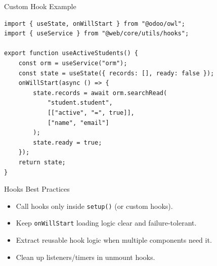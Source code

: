 \begin{frame}[fragile]{Custom Hook Example}
\begin{lstlisting}[style=js]
import { useState, onWillStart } from "@odoo/owl";
import { useService } from "@web/core/utils/hooks";

export function useActiveStudents() {
	const orm = useService("orm");
	const state = useState({ records: [], ready: false });
	onWillStart(async () => {
		state.records = await orm.searchRead(
			"student.student",
			[["active", "=", true]],
			["name", "email"]
		);
		state.ready = true;
	});
	return state;
}
\end{lstlisting}
\end{frame}

\begin{frame}{Hooks Best Practices}
	\begin{itemize}
		\item Call hooks only inside \texttt{setup()} (or custom hooks).
		\item Keep \texttt{onWillStart} loading logic clear and failure-tolerant.
		\item Extract reusable hook logic when multiple components need it.
		\item Clean up listeners/timers in unmount hooks.
	\end{itemize}
\end{frame}

